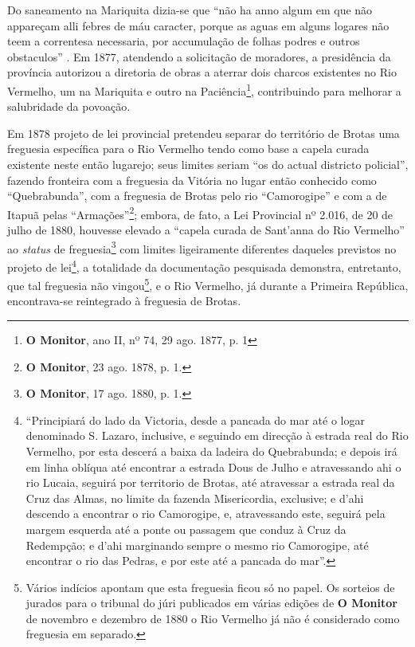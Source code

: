 Do saneamento na Mariquita dizia-se que ``não ha anno algum em que não appareçam alli febres de máu caracter, porque as aguas em alguns logares não teem a correntesa necessaria, por accumulação de folhas podres e outros obstaculos'' \cite[p.~20]{bahia_relatassleg_1873}. Em 1877, atendendo a solicitação de moradores, a presidência da província autorizou a diretoria de obras a aterrar dois charcos existentes no Rio Vermelho, um na Mariquita e outro na Paciência\footnote{\textbf{O Monitor}, ano II, nº 74, 29 ago. 1877, p. 1}, contribuindo para melhorar a salubridade da povoação.

Em 1878 projeto de lei provincial pretendeu separar do território de Brotas uma freguesia específica para o Rio Vermelho tendo como base a capela curada existente neste então lugarejo; seus limites seriam ``os do actual districto policial'', fazendo fronteira com a freguesia da Vitória no lugar então conhecido como ``Quebrabunda'', com a freguesia de Brotas pelo rio ``Camorogipe'' e com a de Itapuã pelas ``Armações''\footnote{\textbf{O Monitor}, 23 ago. 1878, p. 1.}; embora, de fato, a Lei Provincial nº 2.016, de 20 de julho de 1880, houvesse elevado a ``capela curada de Sant'anna do Rio Vermelho'' ao \textit{status} de freguesia\footnote{\textbf{O Monitor}, 17 ago. 1880, p. 1.} com limites ligeiramente diferentes daqueles previstos no projeto de lei\footnote{``Principiará do lado da Victoria, desde a pancada do mar até o logar denominado S. Lazaro, inclusive, e seguindo em direcção à estrada real do Rio Vermelho, por esta descerá a baixa da ladeira do Quebrabunda; e depois irá em linha oblíqua até encontrar a estrada Dous de Julho e atravessando ahi o rio Lucaia, seguirá por territorio de Brotas, até atravessar a estrada real da Cruz das Almas, no limite da fazenda Misericordia, exclusive; e d'ahi descendo a encontrar o rio Camorogipe, e, atravessando este, seguirá pela margem esquerda até a ponte ou passagem que conduz à Cruz da Redempção; e d'ahi marginando sempre o mesmo rio Camorogipe, até encontrar o rio das Pedras, e por este até a pancada do mar''.}, a totalidade da documentação pesquisada demonstra, entretanto, que tal freguesia não vingou\footnote{Vários indícios apontam que esta freguesia ficou só no papel. Os sorteios de jurados para o tribunal do júri publicados em várias edições de \textbf{O Monitor} de novembro e dezembro de 1880 o Rio Vermelho já não é considerado como freguesia em separado.}, e o Rio Vermelho, já durante a Primeira República, encontrava-se reintegrado à freguesia de Brotas.

